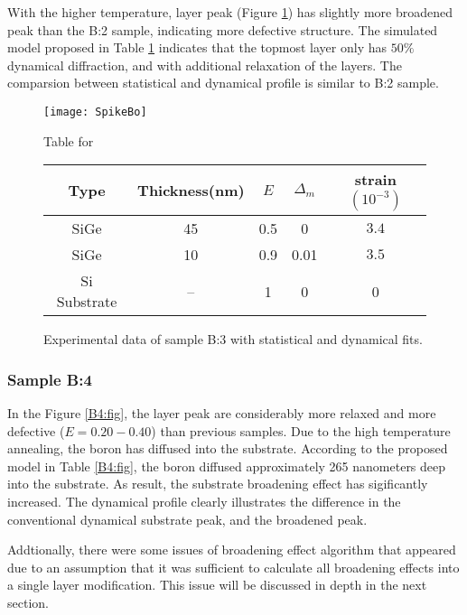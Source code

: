 With the higher temperature, layer peak (Figure \ref{B3:fig}) has slightly more broadened peak than the B:2 sample, indicating more defective structure.  The simulated model proposed in Table \ref{B3:fig} indicates that the topmost layer only has $50\%$ dynamical diffraction, and with additional relaxation of the layers.  The comparsion between statistical and dynamical profile is similar to B:2 sample.
\begin{figure}[ht]%
\caption{Experimental data of sample B:3 with statistical and dynamical fits.}
\label{B3:fig}
\begin{minipage}{\linewidth}
\texttt{[image: SpikeBo]}
\end{minipage}
\begin{minipage}{\linewidth}
\vspace{10pt}
	\centering
Table for \\
 \begin{tabular}[htbp]{@{}c|cccc@{}}
    \hline
  Type & Thickness(nm) & $E$ & $\Delta_m$ & strain $(10^{-3})$ \\
    \hline
  SiGe & 45 & 0.5 & 0 & $3.4 $  \\
  SiGe & 10 & 0.9 & 0.01 & $3.5 $  \\
    Si Substrate & -- & 1 & 0 & 0
  \end{tabular}
\end{minipage}
\end{figure}



\subsubsection{Sample B:4}

In the Figure \ref{B4:fig}, the layer peak are considerably more relaxed and more defective ($E =0.20-0.40$) than previous samples.  Due to the high temperature annealing, the boron has diffused into the substrate.  According to the proposed model in Table \ref{B4:fig}, the boron diffused approximately 265 nanometers deep into the substrate.  As result, the substrate broadening effect has sigificantly increased.  The dynamical profile clearly illustrates the difference in the conventional dynamical substrate peak, and the broadened peak.

Addtionally, there were some issues of broadening effect algorithm that appeared due to an assumption that it was sufficient to calculate all broadening effects into a single layer modification.  This issue will be discussed in depth in the next section.


